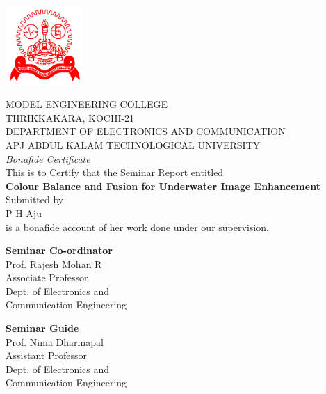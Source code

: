 \documentclass[hidelinks, 12pt]{report}
\begin{document}
\centering
\section*{}
\vspace{1cm}
\includegraphics[height=3cm,width=3cm]{logo}

\begin{center}
MODEL ENGINEERING COLLEGE\\
\vspace{0.5cm}
THRIKKAKARA, KOCHI-21\\
\vspace{0.5cm}
DEPARTMENT OF ELECTRONICS AND COMMUNICATION \\
\vspace{0.5cm}
APJ ABDUL KALAM TECHNOLOGICAL UNIVERSITY \\
\vspace{1cm}
\textit{Bonafide Certificate}
\\This is to Certify that the Seminar Report entitled\\
\vspace{0.5cm}
\textbf{Colour Balance and Fusion for Underwater Image Enhancement} 
\\
\vspace{0.5cm}
Submitted by\\
\vspace{0.2cm}
P H Aju\\
\vspace{0.2cm}
is a bonafide account of her work done under our supervision. \\
\end{center}

\vspace{2cm}
\begin{minipage}[t]{10cm}
\flushleft \textbf{Seminar Co-ordinator}\\
Prof. Rajesh Mohan R\\
Associate Professor\\
Dept. of Electronics and\\
Communication Engineering
\end{minipage}
\vspace{2cm}
\begin{minipage}[t]{5cm}
\flushleft \textbf{Seminar Guide}\\
Prof. Nima Dharmapal\\
Assistant Professor\\
Dept. of Electronics and\\
Communication Engineering
\end{minipage}
\end{document}
